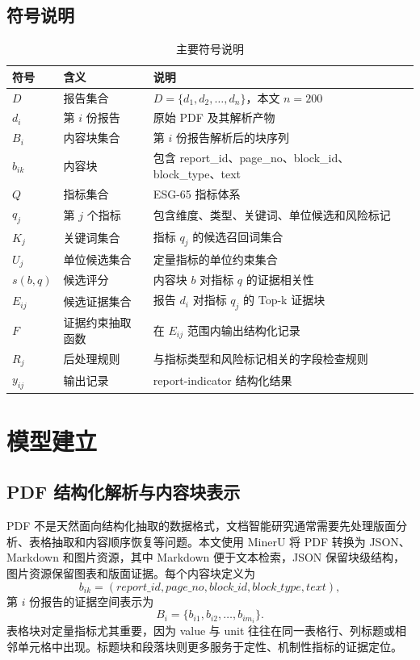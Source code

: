 \documentclass[bwprint]{gmcmthesis}
\numberwithin{figure}{section}
\begin{document}
\subsection{符号说明}
\begin{table}[htbp]
\centering
\caption{主要符号说明}
\label{tab:symbols}
\begin{tabularx}{\linewidth}{llX}
\toprule
符号 & 含义 & 说明 \\
\midrule
$D$ & 报告集合 & $D=\{d_1,d_2,\ldots,d_n\}$，本文 $n=200$ \\
$d_i$ & 第 $i$ 份报告 & 原始 PDF 及其解析产物 \\
$B_i$ & 内容块集合 & 第 $i$ 份报告解析后的块序列 \\
$b_{ik}$ & 内容块 & 包含 report\_id、page\_no、block\_id、block\_type、text \\
$Q$ & 指标集合 & ESG-65 指标体系 \\
$q_j$ & 第 $j$ 个指标 & 包含维度、类型、关键词、单位候选和风险标记 \\
$K_j$ & 关键词集合 & 指标 $q_j$ 的候选召回词集合 \\
$U_j$ & 单位候选集合 & 定量指标的单位约束集合 \\
$s(b,q)$ & 候选评分 & 内容块 $b$ 对指标 $q$ 的证据相关性 \\
$E_{ij}$ & 候选证据集合 & 报告 $d_i$ 对指标 $q_j$ 的 Top-k 证据块 \\
$F$ & 证据约束抽取函数 & 在 $E_{ij}$ 范围内输出结构化记录 \\
$R_j$ & 后处理规则 & 与指标类型和风险标记相关的字段检查规则 \\
$y_{ij}$ & 输出记录 & report-indicator 结构化结果 \\
\bottomrule
\end{tabularx}
\end{table}

\newpage
\section{模型建立}
\subsection{PDF 结构化解析与内容块表示}
PDF 不是天然面向结构化抽取的数据格式，文档智能研究通常需要先处理版面分析、表格抽取和内容顺序恢复等问题\parencite{zhong2019publaynet,smock2022pubtables}。本文使用 MinerU 将 PDF 转换为 JSON、Markdown 和图片资源\parencite{cui2025mineru}，其中 Markdown 便于文本检索，JSON 保留块级结构，图片资源保留图表和版面证据。每个内容块定义为
\begin{equation}
b_{ik}=(report\_id,page\_no,block\_id,block\_type,text),
\end{equation}
第 $i$ 份报告的证据空间表示为
\begin{equation}
B_i=\{b_{i1},b_{i2},\ldots,b_{im_i}\}.
\end{equation}
表格块对定量指标尤其重要，因为 value 与 unit 往往在同一表格行、列标题或相邻单元格中出现。标题块和段落块则更多服务于定性、机制性指标的证据定位。
\end{document}
